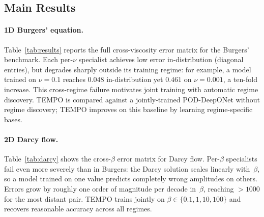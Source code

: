 \documentclass{article}
\begin{document}
\subsection{Main Results}
\label{sec:results}

\paragraph{1D Burgers' equation.}
Table~\ref{tab:results} reports the full cross-viscosity error matrix for the
Burgers' benchmark.
Each per-$\nu$ specialist achieves low error in-distribution (diagonal entries),
but degrades sharply outside its training regime: for example, a model trained
on $\nu{=}0.1$ reaches $0.048$ in-distribution yet $0.461$ on $\nu{=}0.001$,
a ten-fold increase.
This cross-regime failure motivates joint training with automatic regime
discovery.
TEMPO is compared against a jointly-trained POD-DeepONet without regime
discovery; TEMPO improves on this baseline by learning regime-specific bases.

\paragraph{2D Darcy flow.}
Table~\ref{tab:darcy} shows the cross-$\beta$ error matrix for Darcy flow.
Per-$\beta$ specialists fail even more severely than in Burgers: the Darcy
solution scales linearly with~$\beta$, so a model trained on one value
predicts completely wrong amplitudes on others.
Errors grow by roughly one order of magnitude per decade in~$\beta$,
reaching ${>}1000$ for the most distant pair.
TEMPO trains jointly on $\beta\in\{0.1,1,10,100\}$ and recovers reasonable
accuracy across all regimes.
\end{document}
